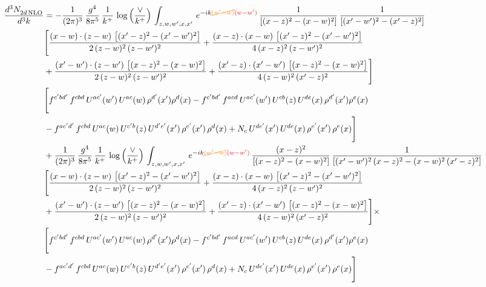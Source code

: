 \documentclass[9pt]{article}
\numberwithin{equation}{section}
\begin{document}
\begin{align}
 \frac{d^{3}N_{2d\,\rm NLO}^{\rm}}{d^{3}k}  & =  -\frac{1}{(2\pi)^{3}}\, \frac{g^{4}}{8\pi^{5}}\,\frac{1}{k^{+}}\,\log{\left(\frac{\vee}{k^{+}}\right)}\,\int_{z,w,w^{\prime},x,x'}\, e^{-ik{\color{orange}\cancel{(w^{\prime}-w)}}{\color{red}(w-w^{\prime})}}\,\frac{1}{\left[(x-z)^{2}-(x-w)^{2}\right]}\, \frac{1}{\left[(x'-w')^{2}-(x'-z)^{2}\right]}\notag \\ & \Bigg[\frac{(x-w)\cdot (z-w)\, \left[(x'-z)^{2}-(x'-w')^{2}\right]}{2\, (z-w)^{2}\, (z-w')^{2}}  + \frac{(x-z)\cdot (x-w)\,\left[(x'-z)^{2}-(x'-w')^{2}\right] }{4\,(x-z)^{2}\,(z-w')^{2}}\notag \\ & +\frac{(x'-w')\cdot (z-w')\, \left[(x-z)^{2}-(x-w)^{2}\right]}{2\, (z-w)^{2}\, (z-w')^{2}}+ \frac{(x'-z)\cdot (x'-w')\, \left[(x-z)^{2}-(x-w)^{2}\right]}{4\, (z-w)^{2}\,(x'-z)^{2}}\Bigg] \notag \\ &  \Bigg[f^{c'bd'}\,f^{cbd}\, U^{ac'}(w')\,U^{ac}(w)\,\rho^{d'}(x')\rho^{d}(x)- f^{c'bd'}\,f^{acd}\,U^{ac'}(w')\,U^{cb}(z)\,U^{de}(x)\,\rho^{d'}(x')\rho^{e}(x) \notag \\ & -f^{ac'd'}\,f^{cbd}\,U^{ac}(w)\,U^{c'b}(z)\,U^{d'e'}(x')\,\rho^{e'}(x')\,\rho^{d}(x) +N_{c}\,U^{de'}(x')\,U^{de}(x)\,\rho^{e'}(x')\,\rho^{e}(x)\Bigg]  \notag \\
& +\frac{1}{(2\pi)^{3}}\, \frac{g^{4}}{8\pi^{5}}\,\frac{1}{k^{+}}\,\log{\left(\frac{\vee}{k^{+}}\right)}\,\int_{z,w,w^{\prime},x,x'}\, e^{-ik{\color{orange}\cancel{(w^{\prime}-w)}}{\color{red}(w-w^{\prime})}}\,\frac{(x-z)^{2}}{\left[(x-z)^{2}-(x-w)^{2}\right]}\,\frac{1}{\left[(x'-w')^{2}\,(x-z)^{2} - (x-w)^{2}\,(x'-z)^{2}\right]}\notag \\ & \Bigg[\frac{(x-w)\cdot (z-w)\, \left[(x'-z)^{2}-(x'-w')^{2}\right]}{2\, (z-w)^{2}\, (z-w')^{2}}  + \frac{(x-z)\cdot (x-w)\,\left[(x'-z)^{2}-(x'-w')^{2}\right] }{4\,(x-z)^{2}\,(z-w')^{2}}\notag \\ & +\frac{(x'-w')\cdot (z-w')\, \left[(x-z)^{2}-(x-w)^{2}\right]}{2\, (z-w)^{2}\, (z-w')^{2}}+ \frac{(x'-z)\cdot (x'-w')\, \left[(x-z)^{2}-(x-w)^{2}\right]}{4\, (z-w)^{2}\,(x'-z)^{2}}\Bigg]\times\,\notag \\ & \Bigg[f^{c'bd'}\,f^{cbd}\, U^{ac'}(w')\,U^{ac}(w)\,\rho^{d'}(x')\rho^{d}(x)- f^{c'bd'}\,f^{acd}\,U^{ac'}(w')\,U^{cb}(z)\,U^{de}(x)\,\rho^{d'}(x')\rho^{e}(x) \notag \\ & -f^{ac'd'}\,f^{cbd}\,U^{ac}(w)\,U^{c'b}(z)\,U^{d'e'}(x')\,\rho^{e'}(x')\,\rho^{d}(x) +N_{c}\,U^{de'}(x')\,U^{de}(x)\,\rho^{e'}(x')\,\rho^{e}(x)\Bigg] \notag \\

\end{align}
\end{document}
